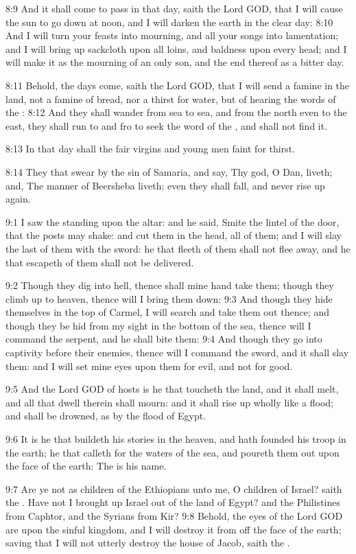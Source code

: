 8:9 And it shall come to pass in that day, saith the Lord GOD, that I will cause the sun to go down at noon, and I will darken the earth in the clear day: 8:10 And I will turn your feasts into mourning, and all your songs into lamentation; and I will bring up sackcloth upon all loins, and baldness upon every head; and I will make it as the mourning of an only son, and the end thereof as a bitter day.

8:11 Behold, the days come, saith the Lord GOD, that I will send a famine in the land, not a famine of bread, nor a thirst for water, but of hearing the words of the \LORD: 8:12 And they shall wander from sea to sea, and from the north even to the east, they shall run to and fro to seek the word of the \LORD, and shall not find it.

8:13 In that day shall the fair virgins and young men faint for thirst.

8:14 They that swear by the sin of Samaria, and say, Thy god, O Dan, liveth; and, The manner of Beersheba liveth; even they shall fall, and never rise up again.

9:1 I saw the \LORD standing upon the altar: and he said, Smite the lintel of the door, that the posts may shake: and cut them in the head, all of them; and I will slay the last of them with the sword: he that fleeth of them shall not flee away, and he that escapeth of them shall not be delivered.

9:2 Though they dig into hell, thence shall mine hand take them; though they climb up to heaven, thence will I bring them down: 9:3 And though they hide themselves in the top of Carmel, I will search and take them out thence; and though they be hid from my sight in the bottom of the sea, thence will I command the serpent, and he shall bite them: 9:4 And though they go into captivity before their enemies, thence will I command the sword, and it shall slay them: and I will set mine eyes upon them for evil, and not for good.

9:5 And the Lord GOD of hosts is he that toucheth the land, and it shall melt, and all that dwell therein shall mourn: and it shall rise up wholly like a flood; and shall be drowned, as by the flood of Egypt.

9:6 It is he that buildeth his stories in the heaven, and hath founded his troop in the earth; he that calleth for the waters of the sea, and poureth them out upon the face of the earth: The \LORD is his name.

9:7 Are ye not as children of the Ethiopians unto me, O children of Israel? saith the \LORD. Have not I brought up Israel out of the land of Egypt? and the Philistines from Caphtor, and the Syrians from Kir?  9:8 Behold, the eyes of the Lord GOD are upon the sinful kingdom, and I will destroy it from off the face of the earth; saving that I will not utterly destroy the house of Jacob, saith the \LORD.


